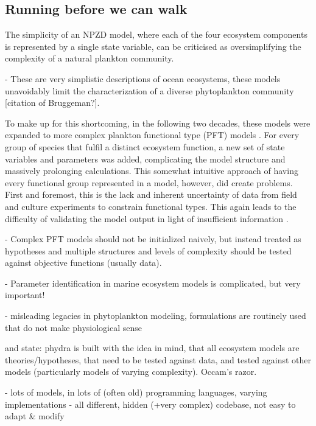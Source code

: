 \documentclass[journal abbreviations, manuscript]{copernicus}
\begin{document}
\subsection{Running before we can walk}
The simplicity of an NPZD model, where each of the four ecosystem components is represented by a single state variable, can be criticised as oversimplifying the complexity of a natural plankton community.

- These are very simplistic descriptions of ocean ecosystems, these models unavoidably limit the characterization of a diverse phytoplankton community [citation of Bruggeman?]. 

To make up for this shortcoming, in the following two decades, these models were expanded to more complex plankton functional type (PFT) models \citep{LeQuere2005}. For every group of species that fulfil a distinct ecosystem function, a new set of state variables and parameters was added, complicating the model structure and massively prolonging calculations. This somewhat intuitive approach of having every functional group represented in a model, however, did create problems. First and foremost, this is the lack and inherent uncertainty of data from field and culture experiments to constrain functional types. This again leads to the difficulty of validating the model output in light of insufficient information \citep{Shimoda2016}.


- Complex PFT models should not be initialized naively, but instead treated as hypotheses and multiple structures and levels of complexity should be tested against objective functions (usually data). \citep{Franks2009}

- Parameter identification in marine ecosystem models is complicated, but very important! \citep{Schartau2017}



- misleading legacies in phytoplankton modeling, formulations are routinely used that do not make physiological sense \citep{Smith2014}

and state: phydra is built with the idea in mind, that all ecosystem models are theories/hypotheses, that need to be tested against data, and tested against other models (particularly models of varying complexity). Occam's razor. 


- lots of models, in lots of (often old) programming languages, varying implementations
- all different, hidden (+very complex) codebase, not easy to adapt \& modify
\end{document}
